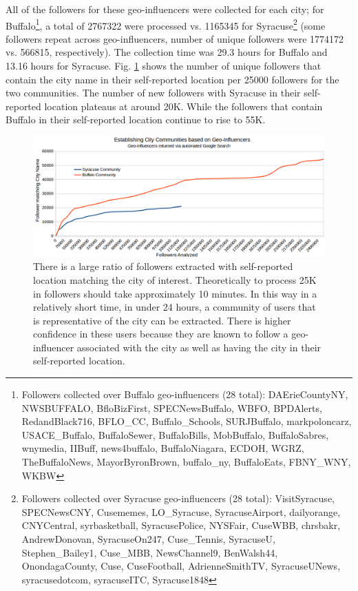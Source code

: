 All of the followers for these geo-influencers were collected for each city; for Buffalo\footnote{Followers collected over Buffalo geo-influencers (28 total): DAErieCountyNY, NWSBUFFALO, BfloBizFirst, SPECNewsBuffalo, WBFO, BPDAlerts, RedandBlack716, BFLO\_CC, Buffalo\_Schools, SURJBuffalo, markpoloncarz, USACE\_Buffalo, BuffaloSewer, BuffaloBills, MobBuffalo, BuffaloSabres, wnymedia, IIBuff, news4buffalo, BuffaloNiagara, ECDOH, WGRZ, TheBuffaloNews, MayorByronBrown, buffalo\_ny, BuffaloEats, FBNY\_WNY, WKBW}, a total of 2767322 were processed vs. 1165345 for Syracuse\footnote{Followers collected over Syracuse geo-influencers (28 total): VisitSyracuse, SPECNewsCNY, Cusememes, LO\_Syracuse, SyracuseAirport, dailyorange, CNYCentral, syrbasketball, SyracusePolice, NYSFair, CuseWBB, chrsbakr, AndrewDonovan, SyracuseOn247, Cuse\_Tennis, SyracuseU, Stephen\_Bailey1, Cuse\_MBB, NewsChannel9, BenWalsh44, OnondagaCounty, Cuse, CuseFootball, AdrienneSmithTV, SyracuseUNews, syracusedotcom, syracuseITC, Syracuse1848} (some followers repeat across geo-influencers, number of unique followers were 1774172 vs. 566815, respectively). The collection time was 29.3 hours for Buffalo and 13.16 hours for Syracuse. Fig. \ref{fig_collectionRun} shows the number of unique followers that contain the city name in their self-reported location per 25000 followers for the two communities. The number of new followers with Syracuse in their self-reported location plateaus at around 20K. While the followers that contain Buffalo in their self-reported location continue to rise to 55K.

\begin{figure}[!t]
\centering
\includegraphics[width=5.6in]{Paper3Figures/FigCollectionRuntime.png}
\caption[Geo-Influencer Collection Runtime]{There is a large ratio of followers extracted with self-reported location matching the city of interest. Theoretically to process 25K in followers should take approximately 10 minutes. In this way in a relatively short time, in under 24 hours, a community of users that is representative of the city can be extracted. There is higher confidence in these users because they are known to follow a geo-influencer associated with the city as well as having the city in their self-reported location.}
\label{fig_collectionRun}
\end{figure}

